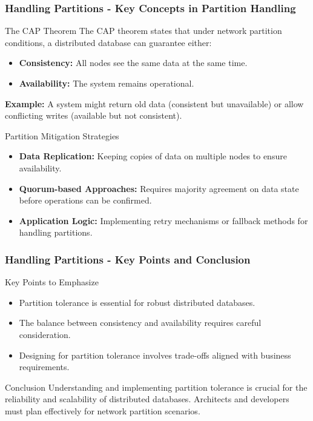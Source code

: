 \documentclass[aspectratio=169]{beamer}
\begin{document}
\begin{frame}[fragile]
    \frametitle{Handling Partitions - Key Concepts in Partition Handling}
    
    \begin{block}{The CAP Theorem}
        The CAP theorem states that under network partition conditions, a distributed database can guarantee either:
        \begin{itemize}
            \item \textbf{Consistency:} All nodes see the same data at the same time.
            \item \textbf{Availability:} The system remains operational.
        \end{itemize}
        \textbf{Example:} A system might return old data (consistent but unavailable) or allow conflicting writes (available but not consistent).
    \end{block}
    
    \begin{block}{Partition Mitigation Strategies}
        \begin{itemize}
            \item \textbf{Data Replication:} Keeping copies of data on multiple nodes to ensure availability.
            \item \textbf{Quorum-based Approaches:} Requires majority agreement on data state before operations can be confirmed.
            \item \textbf{Application Logic:} Implementing retry mechanisms or fallback methods for handling partitions.
        \end{itemize}
    \end{block}
\end{frame}

\begin{frame}[fragile]
    \frametitle{Handling Partitions - Key Points and Conclusion}
    
    \begin{block}{Key Points to Emphasize}
        \begin{itemize}
            \item Partition tolerance is essential for robust distributed databases.
            \item The balance between consistency and availability requires careful consideration.
            \item Designing for partition tolerance involves trade-offs aligned with business requirements.
        \end{itemize}
    \end{block}
    
    \begin{block}{Conclusion}
        Understanding and implementing partition tolerance is crucial for the reliability and scalability of distributed databases. Architects and developers must plan effectively for network partition scenarios.
    \end{block}
\end{frame}
\end{document}
